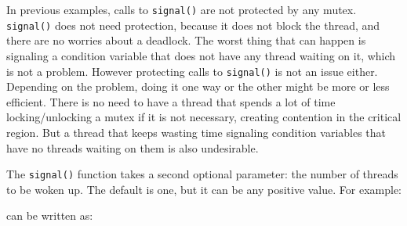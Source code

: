 
In previous examples, calls to \texttt{signal()} are not protected by any
mutex. \texttt{signal()} does not need protection, because it does not block the
thread, and there are no worries about a deadlock. The worst thing that can
happen is signaling a condition variable that does not have any thread waiting
on it, which is not a problem.  However protecting calls to \texttt{signal()} is
not an issue either.  Depending on the problem, doing it one way or the other
might be more or less efficient.  There is no need to have a thread that spends
a lot of time locking/unlocking a mutex if it is not necessary, creating
contention in the critical region.  But a thread that keeps wasting time
signaling condition variables that have no threads waiting on them is also
undesirable.

The \texttt{signal()} function takes a second optional parameter: the
number of threads to be woken up. The default is one, but it can be
any positive value.  For example:


\noindent
can be written as:


